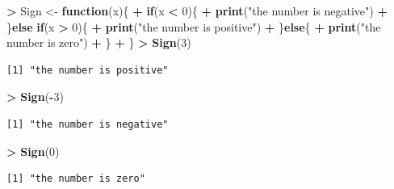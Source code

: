 \documentclass[
]{krantz}
\makeatletter
\newenvironment{Shaded}{\begin{snugshade}}{\end{snugshade}}
\newcommand{\ControlFlowTok}[1]{\textcolor[rgb]{0.27,0.27,0.27}{\textbf{#1}}}
\newcommand{\DecValTok}[1]{\textcolor[rgb]{0.06,0.06,0.06}{#1}}
\newcommand{\KeywordTok}[1]{\textcolor[rgb]{0.27,0.27,0.27}{\textbf{#1}}}
\newcommand{\NormalTok}[1]{#1}
\newcommand{\OperatorTok}[1]{\textcolor[rgb]{0.43,0.43,0.43}{\textbf{#1}}}
\newcommand{\StringTok}[1]{\textcolor[rgb]{0.5,0.5,0.5}{#1}}
\newenvironment{kframe}{%
\medskip{}
\setlength{\fboxsep}{.8em}
 \def\at@end@of@kframe{}%
 \ifinner\ifhmode%
  \def\at@end@of@kframe{\end{minipage}}%
  \begin{minipage}{\columnwidth}%
 \fi\fi%
 \def\FrameCommand##1{\hskip\@totalleftmargin \hskip-\fboxsep
 \colorbox{shadecolor}{##1}\hskip-\fboxsep
     \hskip-\linewidth \hskip-\@totalleftmargin \hskip\columnwidth}%
 \MakeFramed {\advance\hsize-\width
   \@totalleftmargin\z@ \linewidth\hsize
   \@setminipage}}%
 {\par\unskip\endMakeFramed%
 \at@end@of@kframe}
\renewenvironment{Shaded}{\begin{kframe}}{\end{kframe}}
\makeatother
\begin{document}
\begin{Shaded}
\begin{Highlighting}[]
\OperatorTok{\textgreater{}}\StringTok{ }\NormalTok{Sign \textless{}{-}}\StringTok{ }\ControlFlowTok{function}\NormalTok{(x)\{}
\OperatorTok{+}\StringTok{     }\ControlFlowTok{if}\NormalTok{(x }\OperatorTok{\textless{}}\StringTok{ }\DecValTok{0}\NormalTok{)\{}
\OperatorTok{+}\StringTok{         }\KeywordTok{print}\NormalTok{(}\StringTok{"the number is negative"}\NormalTok{)}
\OperatorTok{+}\StringTok{     }\NormalTok{\}}\ControlFlowTok{else} \ControlFlowTok{if}\NormalTok{(x }\OperatorTok{\textgreater{}}\StringTok{ }\DecValTok{0}\NormalTok{)\{}
\OperatorTok{+}\StringTok{         }\KeywordTok{print}\NormalTok{(}\StringTok{"the number is positive"}\NormalTok{)}
\OperatorTok{+}\StringTok{     }\NormalTok{\}}\ControlFlowTok{else}\NormalTok{\{}
\OperatorTok{+}\StringTok{         }\KeywordTok{print}\NormalTok{(}\StringTok{"the number is zero"}\NormalTok{)}
\OperatorTok{+}\StringTok{     }\NormalTok{\}}
\OperatorTok{+}\StringTok{ }\NormalTok{\}}
\OperatorTok{\textgreater{}}\StringTok{ }\KeywordTok{Sign}\NormalTok{(}\DecValTok{3}\NormalTok{)}
\end{Highlighting}
\end{Shaded}

\begin{verbatim}
[1] "the number is positive"
\end{verbatim}

\begin{Shaded}
\begin{Highlighting}[]
\OperatorTok{\textgreater{}}\StringTok{ }\KeywordTok{Sign}\NormalTok{(}\OperatorTok{{-}}\DecValTok{3}\NormalTok{)}
\end{Highlighting}
\end{Shaded}

\begin{verbatim}
[1] "the number is negative"
\end{verbatim}

\begin{Shaded}
\begin{Highlighting}[]
\OperatorTok{\textgreater{}}\StringTok{ }\KeywordTok{Sign}\NormalTok{(}\DecValTok{0}\NormalTok{)}
\end{Highlighting}
\end{Shaded}

\begin{verbatim}
[1] "the number is zero"
\end{verbatim}
\end{document}
